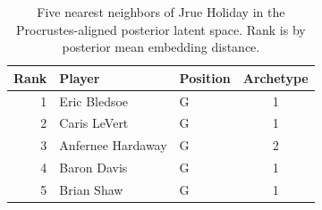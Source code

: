 \begin{table}[htbp]
  \centering\small
  \begin{tabular}{rllc}
    \toprule
    Rank & Player & Position & Archetype \\
    \midrule
    1 & Eric Bledsoe & G & 1 \\
    2 & Caris LeVert & G & 1 \\
    3 & Anfernee Hardaway & G & 2 \\
    4 & Baron Davis & G & 1 \\
    5 & Brian Shaw & G & 1 \\
    \bottomrule
  \end{tabular}
  \caption{Five nearest neighbors of Jrue Holiday in the Procrustes-aligned posterior latent space. Rank is by posterior mean embedding distance.}
  \label{tab:Jrue_Holiday_neighbors}
\end{table}

